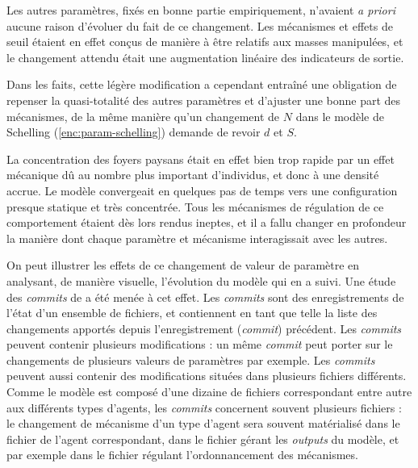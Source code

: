 Les autres paramètres, fixés en bonne partie empiriquement, n'avaient \textit{a priori} aucune raison d'évoluer du fait de ce changement.
Les mécanismes  et effets de seuil étaient en effet conçus de manière à être relatifs aux masses manipulées, et le changement attendu était une augmentation linéaire des indicateurs de sortie.

Dans les faits, cette légère modification a cependant entraîné une obligation de repenser la quasi-totalité des autres paramètres et d'ajuster une bonne part des mécanismes, de la même manière qu'un changement de $N$ dans le modèle de Schelling (\cref{enc:param-schelling}) demande de revoir $d$ et $S$.

La concentration des foyers paysans était en effet bien trop rapide par un effet mécanique dû au nombre plus important d'individus, et donc à une densité accrue.
Le modèle convergeait en quelques pas de temps vers une configuration presque statique et très concentrée.
Tous les mécanismes de régulation de ce comportement étaient dès lors rendus ineptes, et il a fallu changer en profondeur la manière dont chaque paramètre et mécanisme interagissait avec les autres.

On peut illustrer les effets de ce changement de valeur de paramètre en analysant, de manière visuelle, l'évolution du modèle qui en a suivi.
Une étude des \og \textit{commits}\fg{} de \simfeodal{} a été menée à cet effet.
Les \textit{commits} sont des enregistrements de l'état d'un ensemble de fichiers, et contiennent en tant que telle la liste des changements apportés depuis l'enregistrement (\textit{commit}) précédent.
Les \textit{commits} peuvent contenir plusieurs modifications : un même \textit{commit} peut porter sur le changements de plusieurs valeurs de paramètres par exemple.
Les \textit{commits} peuvent aussi contenir des modifications situées dans plusieurs fichiers différents.
Comme le modèle \simfeodal{} est composé d'une dizaine de fichiers correspondant entre autre aux différents types d'agents, les \textit{commits} concernent souvent plusieurs fichiers : le changement de mécanisme d'un type d'agent sera souvent matérialisé dans le fichier de l'agent correspondant, dans le fichier gérant les \textit{outputs} du modèle, et par exemple dans le fichier régulant l'ordonnancement des mécanismes.

